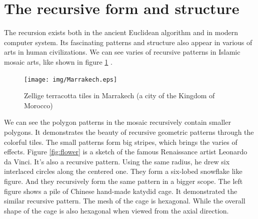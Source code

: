 \documentclass{article}
\begin{document}
\begin{Exercise}
\end{Exercise}

\section{The recursive form and structure}

The recursion exists both in the ancient Euclidean algorithm and in modern computer system. Its fascinating patterns and structure also appear in various of arts in human civilizations. We can see varies of recursive patterns in Islamic mosaic arts, like shown in figure \ref{fig:Ceramic-Tile-Tessellations-Marrakech} .

\begin{figure}[htbp]
 \centering
 \texttt{[image: img/Marrakech.eps]}
 \caption{Zellige terracotta tiles in Marrakech (a city of the Kingdom of Morocco)}
 \label{fig:Ceramic-Tile-Tessellations-Marrakech}
\end{figure}

We can see the polygon patterns in the mosaic recursively contain smaller polygons. It demonstrates the beauty of recursive geometric patterns through the colorful tiles. The small patterns form big stripes, which brings the varies of effects. Figure \ref{fig:flower} is a sketch of the famous Renaissance artist Leonardo da Vinci. It's also a recursive pattern. Using the same radius, he drew six interlaced circles along the centered one. They form a six-lobed snowflake like figure. And they recursively form the same pattern in a bigger scope. The left figure shows a pile of Chinese hand-made katydid cage. It demonstrated the similar recursive pattern. The mesh of the cage is hexagonal. While the overall shape of the cage is also hexagonal when viewed from the axial direction.
\end{document}
